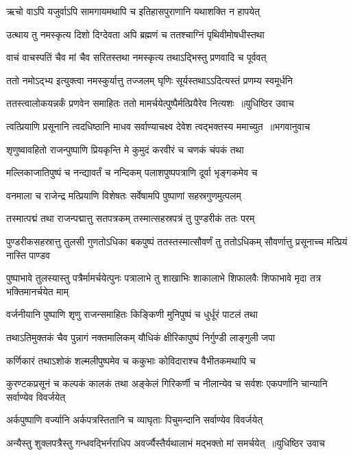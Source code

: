 \twolineshloka
{ऋचो वाऽपि यजुर्वाऽपि सामगायमथापि च}
{इतिहासपुराणानि यथाशक्ति न हापयेत्}


\twolineshloka
{उत्थाय तु नमस्कृत्य दिशो दिग्देवता अपि}
{ब्रह्मणं च ततश्चाग्निं पृथिवीमोषधीस्तथा}


\twolineshloka
{वाचं वाचस्पतिं चैव मां चैव सरितस्तथा}
{नमस्कृत्य तथाऽद्भिस्तु प्रणवादि च पूर्ववत्}


\twolineshloka
{ततो नमोऽद्भ्य इत्युक्त्वा नमस्कुर्यात्तु तज्जलम्}
{घृणिः सूर्यस्तथाऽऽदित्यस्तं प्रणम्य स्वमूर्धनि}


\threelineshloka
{ततस्त्वालोकयन्नर्कं प्रणवेन समाहितः}
{ततो मामर्चयेत्पुष्पैर्मत्प्रियैरेव नित्यशः ॥युधिष्ठिर उवाच}
{}


\threelineshloka
{त्वत्प्रियाणि प्रसूनानि त्वदधिष्ठानि माधव}
{सर्वाण्याचक्ष्व देवेश त्वद्भक्तस्य ममाच्युत ॥भगवानुवाच}
{}


\twolineshloka
{शृणुष्वावहितो राजन्पुष्पाणि प्रियकृन्ति मे}
{कुमुदं करवीरं च चणकं चंपकं तथा}


\twolineshloka
{मल्लिकाजातिपुष्पं च नन्द्यावर्तं च नन्दिकम्}
{पलाशपुष्पपत्राणि दूर्वा भृङ्गकमेव च}


\twolineshloka
{वनमाला च राजेन्द्र मत्प्रियाणि विशेषतः}
{सर्वेषामपि पुष्पाणां सहस्रगुणमुत्पलम्}


\twolineshloka
{तस्मात्पद्मं तथा राजन्पद्मात्तु सतपत्रकम्}
{तस्मात्सहस्रपत्रं तु पुण्डरीकं ततः परम्}


\threelineshloka
{पुण्डरीकसहस्रात्तु तुलसी गुणतोऽधिका}
{बकपुष्पं ततस्तस्मात्सौवर्णं तु ततोऽधिकम्}
{सौवर्णात्तु प्रसूनाच्च मत्प्रियं नास्ति पाण्डव}


\threelineshloka
{पुष्पाभावे तुलस्यास्तु पत्रैर्मामर्चयेत्पुनः}
{पत्रालाभे तु शाखाभिः शाकालाभे शिफालवैः}
{शिफाभावे मृदा तत्र भक्तिमानर्चयेत माम्}


\twolineshloka
{वर्जनीयानि पुष्पाणि शृणु राजन्समाहितः}
{किङ्किणी मुनिपुष्पं च धुर्धूरं पाटलं तथा}


\twolineshloka
{तथाऽतिमुक्तकं चैव पुन्नागं नक्तमालिकम्}
{यौधिकं क्षीरिकापुष्पं निर्गुण्डी लाङ्गुली जपा}


\twolineshloka
{कर्णिकारं तथाऽशोकं शल्मलीपुष्पमेव च}
{ककुभाः कोविदाराश्च वैभीतकमथापि च}


\threelineshloka
{कुरण्टकप्रसूनं च कल्पकं कालकं तथा}
{अङ्केलं गिरिकर्णी च नीलान्येव च सर्वशः}
{एकपर्णानि चान्यानि सर्वाण्येव विवर्जयेत्}


\twolineshloka
{अर्कपुष्पाणि वर्ज्यानि अर्कपत्रस्तितानि च}
{व्याघृताः पिचुमन्दानि सर्वाण्येव विवर्जयेत्}


\threelineshloka
{अन्यैस्तु शुक्लपत्रैस्तु गन्धवद्भिर्नराधिप}
{अवर्ज्यैस्तैर्यथालाभं मद्भक्तो मां समर्चयेत् ॥युधिष्ठिर उवाच}
{}


